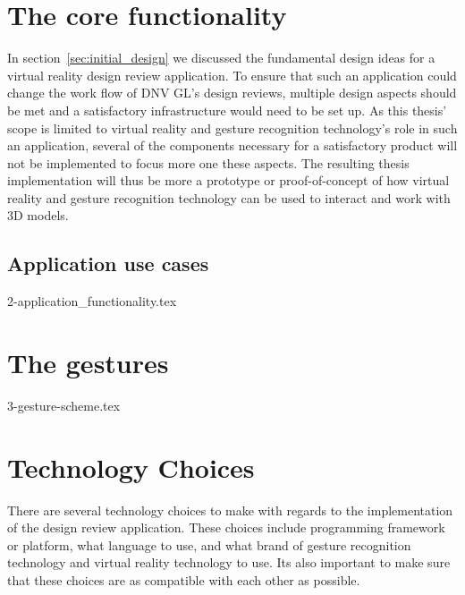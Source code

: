 \section{The core functionality} 
In section~\vref{sec:initial_design} we discussed the fundamental design ideas for a virtual reality design review application. 
To ensure that such an application could change the work flow of DNV GL's design reviews, multiple design aspects should be met and a satisfactory infrastructure would need to be
set up. As this thesis' scope is limited to virtual reality and gesture recognition technology's role in such an application, several of the components necessary for
a satisfactory product will not be implemented to focus more one these aspects. The resulting thesis implementation will thus be more a prototype or proof-of-concept of 
how virtual reality and gesture recognition technology can be used to interact and work with 3D models. 

\subsection{Application use cases}
{2-application_functionality.tex}

\section{The gestures}
\label{sec:gesture_design}
{3-gesture-scheme.tex}

\section{Technology Choices}
There are several technology choices to make with regards to the implementation of the design review application.
These choices include programming framework or platform, what language to use, and what brand of gesture recognition technology and
virtual reality technology to use. Its also important to make sure that these choices are as compatible with each other as possible.

